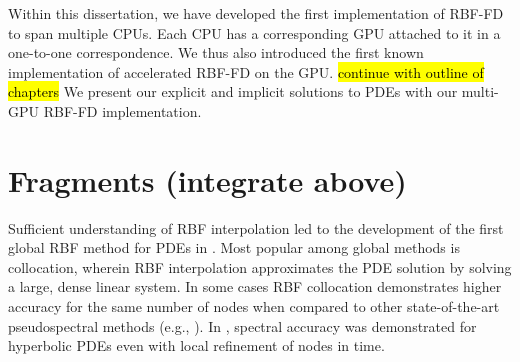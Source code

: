 Within this dissertation, we have developed the first implementation of RBF-FD
to span multiple CPUs. Each CPU has a corresponding GPU attached to it
in a one-to-one correspondence. We thus also introduced the first known 
implementation of accelerated RBF-FD on the GPU. \hl{continue with outline of chapters} 
We present our explicit and implicit solutions to PDEs with our multi-GPU RBF-FD implementation. 


\section{Fragments (integrate above) }



Sufficient understanding of RBF interpolation led to the development of the first global RBF method for PDEs in \cite{Kansa1990a}. Most popular among global methods is collocation, wherein RBF interpolation approximates the PDE solution by solving a large, dense linear system. 
In some cases RBF collocation demonstrates higher accuracy for the same number of nodes when compared to other state-of-the-art pseudospectral methods (e.g., \cite{Larsson2003} \cite{Flyer2007} \cite{Flyer2009b}). In \cite{Flyer2010}, spectral accuracy was demonstrated for hyperbolic PDEs even with local refinement of nodes in time.


